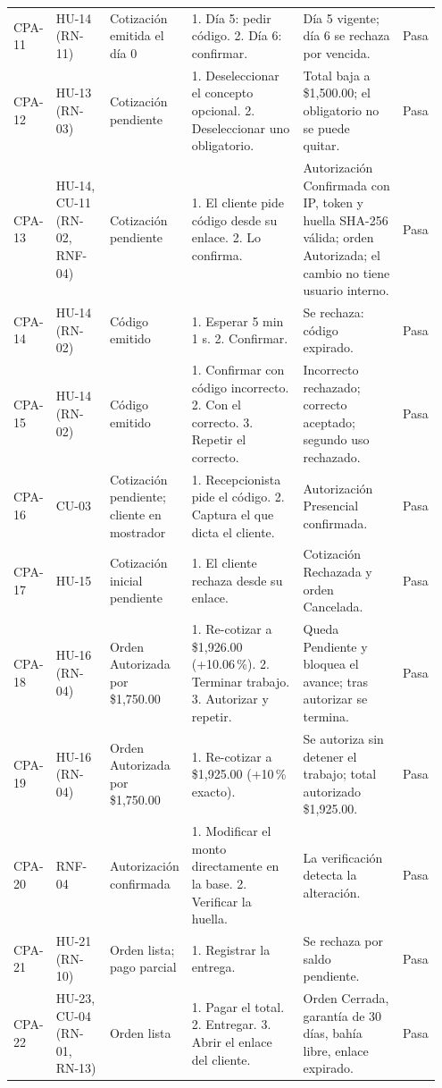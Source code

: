 {\begin{longtable}{@{}L{0.07\linewidth}L{0.13\linewidth}L{0.17\linewidth}L{0.27\linewidth}L{0.24\linewidth}L{0.07\linewidth}@{}}
CPA-11 & HU-14 (RN-11) & Cotización emitida el día 0 & 1. Día 5: pedir código. 2. Día 6: confirmar. & Día 5 vigente; día 6 se rechaza por vencida. & Pasa \\
CPA-12 & HU-13 (RN-03) & Cotización pendiente & 1. Deseleccionar el concepto opcional. 2. Deseleccionar uno obligatorio. & Total baja a \$1,500.00; el obligatorio no se puede quitar. & Pasa \\
CPA-13 & HU-14, CU-11 (RN-02, RNF-04) & Cotización pendiente & 1. El cliente pide código desde su enlace. 2. Lo confirma. & Autorización Confirmada con IP, token y huella SHA-256 válida; orden Autorizada; el cambio no tiene usuario interno. & Pasa \\
CPA-14 & HU-14 (RN-02) & Código emitido & 1. Esperar 5 min 1 s. 2. Confirmar. & Se rechaza: código expirado. & Pasa \\
CPA-15 & HU-14 (RN-02) & Código emitido & 1. Confirmar con código incorrecto. 2. Con el correcto. 3. Repetir el correcto. & Incorrecto rechazado; correcto aceptado; segundo uso rechazado. & Pasa \\
CPA-16 & CU-03 & Cotización pendiente; cliente en mostrador & 1. Recepcionista pide el código. 2. Captura el que dicta el cliente. & Autorización Presencial confirmada. & Pasa \\
CPA-17 & HU-15 & Cotización inicial pendiente & 1. El cliente rechaza desde su enlace. & Cotización Rechazada y orden Cancelada. & Pasa \\
CPA-18 & HU-16 (RN-04) & Orden Autorizada por \$1,750.00 & 1. Re-cotizar a \$1,926.00 (+10.06\,\%). 2. Terminar trabajo. 3. Autorizar y repetir. & Queda Pendiente y bloquea el avance; tras autorizar se termina. & Pasa \\
CPA-19 & HU-16 (RN-04) & Orden Autorizada por \$1,750.00 & 1. Re-cotizar a \$1,925.00 (+10\,\% exacto). & Se autoriza sin detener el trabajo; total autorizado \$1,925.00. & Pasa \\
CPA-20 & RNF-04 & Autorización confirmada & 1. Modificar el monto directamente en la base. 2. Verificar la huella. & La verificación detecta la alteración. & Pasa \\
CPA-21 & HU-21 (RN-10) & Orden lista; pago parcial & 1. Registrar la entrega. & Se rechaza por saldo pendiente. & Pasa \\
CPA-22 & HU-23, CU-04 (RN-01, RN-13) & Orden lista & 1. Pagar el total. 2. Entregar. 3. Abrir el enlace del cliente. & Orden Cerrada, garantía de 30 días, bahía libre, enlace expirado. & Pasa \\

\end{longtable}}
